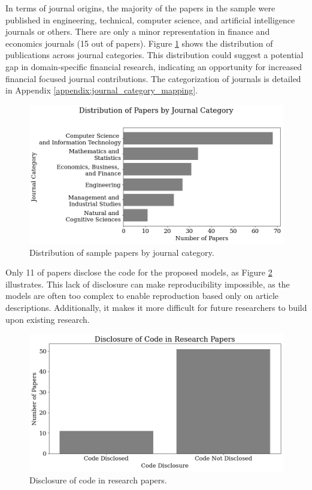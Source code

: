In terms of journal origins, the majority of the papers in the sample were published in engineering, technical, computer science, and artificial intelligence journals or others. There are only a minor representation in finance and economics journals (15 out of \samplesize papers). Figure \ref{fig:num_papers_per_journal_category} shows the distribution of publications across journal categories. This distribution could suggest a potential gap in domain-specific financial research, indicating an opportunity for increased financial focused journal contributions. The categorization of journals is detailed in Appendix \ref{appendix:journal_category_mapping}. 

\begin{figure}[H]
    \centering
    \includegraphics[width=1\linewidth]{Images/num_papers_per_journal_category.png}
    \caption[Number of papers by journal category]{Distribution of sample papers by journal category.}
    \label{fig:num_papers_per_journal_category}
\end{figure}
Only 11 of \samplesize papers disclose the code for the proposed models, as Figure \ref{fig:code_disclosure} illustrates. This lack of disclosure can make reproducibility impossible, as the models are often too complex to enable reproduction based only on article descriptions. Additionally, it makes it more difficult for future researchers to build upon existing research.
\begin{figure}[H]
    \centering
    \includegraphics[width=1\linewidth]{Images/code_disclosure.png}
    \caption[Disclosure of model code in research papers]{Disclosure of code in research papers.}
    \label{fig:code_disclosure}
\end{figure}

